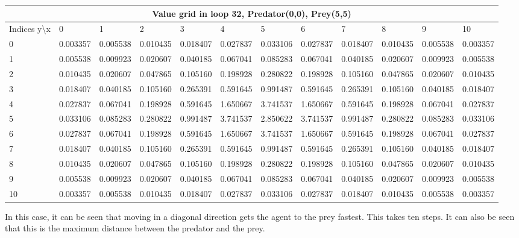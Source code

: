 \documentclass{article}
\begin{document}
\begin{center}
\scalebox{0.7}
	{
	\begin{tabular}{ |l | l | l | l | l | l | l | l | l | l | l | l|}
	\hline
	\multicolumn{12}{|c|}{Value grid in loop 32, Predator(0,0), Prey(5,5)}\\
	\hline
	Indices y\textbackslash x &0 & 1 & 2 & 3 & 4 & 5 & 6 & 7 & 8 & 9 & 10 \\ 

\hline
0 & \cellcolor{green!40}0.003357 & 0.005538 & 0.010435 & 0.018407 & 0.027837 & 0.033106 & 0.027837 & 0.018407 & 0.010435 & 0.005538 & 0.003357 \\
1 & 0.005538 & 0.009923 & 0.020607 & 0.040185 & 0.067041 & 0.085283 & 0.067041 & 0.040185 & 0.020607 & 0.009923 & 0.005538 \\
2 & 0.010435 & 0.020607 & 0.047865 & 0.105160 & 0.198928 & 0.280822 & 0.198928 & 0.105160 & 0.047865 & 0.020607 & 0.010435 \\
3 & 0.018407 & 0.040185 & 0.105160 & 0.265391 & 0.591645 & 0.991487 & 0.591645 & 0.265391 & 0.105160 & 0.040185 & 0.018407 \\
4 & 0.027837 & 0.067041 & 0.198928 & 0.591645 & 1.650667 & 3.741537 & 1.650667 & 0.591645 & 0.198928 & 0.067041 & 0.027837 \\
5 & 0.033106 & 0.085283 & 0.280822 & 0.991487 & 3.741537 & \cellcolor{red!40}2.850622 & 3.741537 & 0.991487 & 0.280822 & 0.085283 & 0.033106 \\
6 & 0.027837 & 0.067041 & 0.198928 & 0.591645 & 1.650667 & 3.741537 & 1.650667 & 0.591645 & 0.198928 & 0.067041 & 0.027837 \\
7 & 0.018407 & 0.040185 & 0.105160 & 0.265391 & 0.591645 & 0.991487 & 0.591645 & 0.265391 & 0.105160 & 0.040185 & 0.018407 \\
8 & 0.010435 & 0.020607 & 0.047865 & 0.105160 & 0.198928 & 0.280822 & 0.198928 & 0.105160 & 0.047865 & 0.020607 & 0.010435 \\
9 & 0.005538 & 0.009923 & 0.020607 & 0.040185 & 0.067041 & 0.085283 & 0.067041 & 0.040185 & 0.020607 & 0.009923 & 0.005538 \\
10 & 0.003357 & 0.005538 & 0.010435 & 0.018407 & 0.027837 & 0.033106 & 0.027837 & 0.018407 & 0.010435 & 0.005538 & 0.003357 \\
\hline
	\end{tabular}
	}
\end{center}

In this case, it can be seen that moving in a diagonal direction gets the agent to the prey fastest. This takes ten steps. It can also be seen that this is the maximum distance between the predator and the prey.
\end{document}
